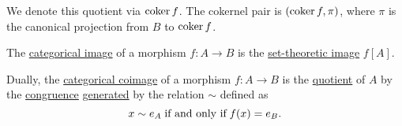 \begin{proposition}
\begin{thmenum}
    We denote this quotient via \( \operatorname*{co\negthinspace\ker} f \). The cokernel pair is \( (\operatorname*{co\negthinspace\ker} f, \pi) \), where \( \pi \) is the canonical projection from \( B \) to \( \operatorname*{co\negthinspace\ker} f \).

     The \hyperref[def:zero_morphisms/image]{categorical image} of a morphism \( f: A \to B \) is the \hyperref[def:set_valued_map/image]{set-theoretic image} \( f[A] \).

     Dually, the \hyperref[def:zero_morphisms/coimage]{categorical coimage} of a morphism \( f: A \to B \) is the \hyperref[def:first_order_quotient]{quotient} of \( A \) by the \hyperref[def:first_order_congruence]{congruence} \hyperref[def:first_order_generated_congruence]{generated} by the relation \( {\sim} \) defined as
    \begin{equation*}
      x \sim e_A \T{if and only if} f(x) = e_B.
    \end{equation*}
  \end{thmenum}
\end{proposition}
